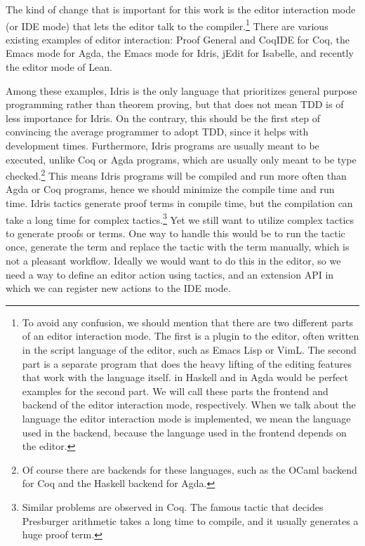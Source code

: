 The kind of change that is important for this work is the editor
interaction mode (or IDE mode) that lets the editor
talk to the compiler.\footnote{To avoid any confusion, we should mention that
  there are two different parts of an editor interaction mode. The first is a
  plugin to the editor, often written in the script language of the editor,
  such as Emacs Lisp or VimL. The second part is a separate program that does
  the heavy lifting of the editing features that work with the language
  itself.   in Haskell and  in Agda would be
  perfect examples for the second part. We will call these parts the frontend
  and backend of the editor interaction mode, respectively.
  When we talk about the language the editor interaction mode is implemented,
  we mean the language used in the backend, because the language used in the
  frontend depends on the editor.}
There are various existing examples of editor interaction:
Proof General\cite{pg} and CoqIDE for Coq\cite{coq},
the Emacs mode\cite{agdamode} for Agda\cite{agda},
the Emacs mode\cite{idrismode} for Idris\cite{idris},
jEdit\cite{isabellejedit} for Isabelle,
and recently the editor mode of Lean\cite{lean}.

Among these examples, Idris is the only language that prioritizes general
purpose programming rather than theorem proving\cite{idrisfaq}, but that does
not mean TDD is of less importance for Idris. On the contrary, this should
be the first step of convincing the average programmer to adopt TDD, since it
helps with development times.
Furthermore, Idris programs are usually meant to be executed, unlike Coq or
Agda programs, which are usually only meant to be type checked.\footnote{Of
  course there are backends for these languages, such as the OCaml
  backend for Coq and the Haskell backend for Agda.}
This means Idris programs will be compiled and run more often than Agda or Coq
programs, hence we should minimize the compile time and run time.
Idris tactics generate proof terms in compile time, but the
compilation can take a long time for complex tactics.\footnote{Similar problems
are observed in Coq. The famous  tactic that decides Presburger
arithmetic takes a long time to compile, and it usually generates a huge proof
term.} Yet we still want to utilize complex tactics to
generate proofs or terms. One way to handle this would be to run the tactic
once, generate the term and replace the tactic with the term manually, which is
not a pleasant workflow. Ideally we would want to do this in the editor, so we
need a way to define an editor action using tactics, and an extension API in
which we can register new actions to the IDE mode.

